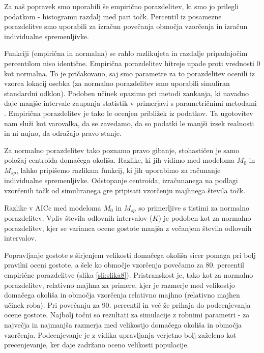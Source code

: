 Za naš popravek smo uporabili še empirično porazdelitev, ki smo jo prilegli podatkom - histogramu razdalj med pari točk. Percentil iz posamezne porazdelitve smo uporabili za izračun povečanja območja vzorčenja in izračun individualne spremenljivke.

Funkciji (empirična in normalna) se rahlo razlikujeta in razdalje pripadajočim percentilom niso identične. Empirična porazdelitev hitreje upade proti vrednosti 0 kot normalna. To je pričakovano, saj smo parametre za to porazdelitev ocenili iz vzorca lokacij osebka (za normalno porazdelitev smo uporabili simuliran standardni odklon). Podoben učinek opazimo pri metodi zankanja, ki navadno daje manjše intervale zaupanja statistik v primerjavi s parametričnimi metodami \citep{hesterberg_what_2015}. Empirična porazdelitev je tako le ocenjen približek iz podatkov. Ta ugotovitev nam služi kot varovalka, da se zavedamo, da so podatki le manjši izsek realnosti in ni nujno, da odražajo pravo stanje.

Za normalno porazdelitev tako poznamo pravo gibanje, stohastičen je samo položaj centroida domačega okoliša. Razlike, ki jih vidimo med modeloma $M_0$ in $M_{sp}$, lahko pripišemo razlikam funkcij, ki jih uporabimo za računanje individualne spremenljivke. Odstopanje centroida, izračunanega na podlagi vzorčenih točk od simuliranega gre pripisati vzorčenju majhnega števila točk.

Razlike v AICc med modeloma $M_0$ in $M_{sp}$ so primerljive s tistimi za normalno porazdelitev. Vpliv števila odlovnih intervalov ($K$) je podoben kot za normalno porazdelitev, kjer se varianca ocene gostote manjša z večanjem števila odlovnih intervalov.

Popravljanje gostote s širjenjem velikosti domačega okoliša sicer pomaga pri bolj pravilni oceni gostote, a šele ko območje vzorčenja povečamo za 80. percentil empirične porazdelitve (slika \ref{sli:slika8}). Pristranskost je, tako kot za normalno porazdelitev, relativno majhna za primere, kjer je razmerje med velikostjo domačega okoliša in območja vzorčenja relativno majhno (relativno majhen učinek roba). Pri povečanju za 90. percentil in več že prihaja do podcenjevanja ocene gostote. Najbolj točni so rezultati za simulacije z robnimi parametri - za največja in najmanjša razmerja med velikostjo domačega okoliša in območja vzorčenja. Podcenjevanje je z vidika upravljanja verjetno bolj zaželeno kot precenjevanje, ker daje zadržano oceno velikosti populacije.

